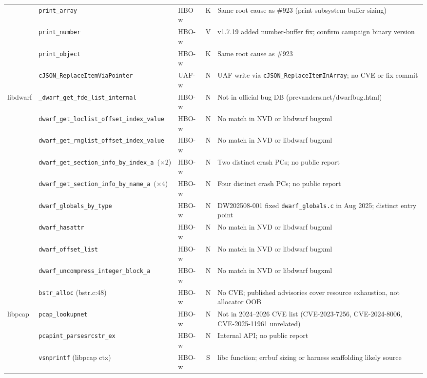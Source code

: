 \begin{table}[htb]
{\begin{tabular}{lllcl}
  & \texttt{print\_array}              & HBO-w & K & Same root cause as \#923 (print subsystem buffer sizing) \\
  & \texttt{print\_number}             & HBO-w & V & v1.7.19 added number-buffer fix; confirm campaign binary version \\
  & \texttt{print\_object}             & HBO-w & K & Same root cause as \#923 \\
  & \texttt{cJSON\_ReplaceItemViaPointer} & UAF-w & N & UAF write via \texttt{cJSON\_ReplaceItemInArray}; no CVE or fix commit \\
\midrule
\multirow{10}{*}{libdwarf}
  & \texttt{\_dwarf\_get\_fde\_list\_internal}           & HBO-w & N & Not in official bug DB (prevanders.net/dwarfbug.html) \\
  & \texttt{dwarf\_get\_loclist\_offset\_index\_value}   & HBO-w & N & No match in NVD or libdwarf bugxml \\
  & \texttt{dwarf\_get\_rnglist\_offset\_index\_value}   & HBO-w & N & No match in NVD or libdwarf bugxml \\
  & \texttt{dwarf\_get\_section\_info\_by\_index\_a}~(×2) & HBO-w & N & Two distinct crash PCs; no public report \\
  & \texttt{dwarf\_get\_section\_info\_by\_name\_a}~(×4) & HBO-w & N & Four distinct crash PCs; no public report \\
  & \texttt{dwarf\_globals\_by\_type}                    & HBO-w & N & DW202508-001 fixed \texttt{dwarf\_globals.c} in Aug 2025; distinct entry point \\
  & \texttt{dwarf\_hasattr}                              & HBO-w & N & No match in NVD or libdwarf bugxml \\
  & \texttt{dwarf\_offset\_list}                         & HBO-w & N & No match in NVD or libdwarf bugxml \\
  & \texttt{dwarf\_uncompress\_integer\_block\_a}        & HBO-w & N & No match in NVD or libdwarf bugxml \\
\midrule
libhtp
  & \texttt{bstr\_alloc} (bstr.c:48)  & HBO-w & N & No CVE; published advisories cover resource exhaustion, not allocator OOB \\
\midrule
\multirow{3}{*}{libpcap}
  & \texttt{pcap\_lookupnet}           & HBO-w & N & Not in 2024--2026 CVE list (CVE-2023-7256, CVE-2024-8006, CVE-2025-11961 unrelated) \\
  & \texttt{pcapint\_parsesrcstr\_ex}  & HBO-w & N & Internal API; no public report \\
  & \texttt{vsnprintf} (libpcap ctx)   & HBO-w & S & libc function; errbuf sizing or harness scaffolding likely source \\

\end{tabular}}
\end{table}
